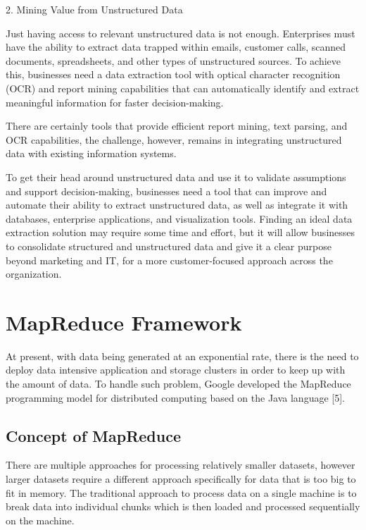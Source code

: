 \documentclass[11pt]{book}
\begin{document}
2.     Mining Value from Unstructured Data

Just having access to relevant unstructured data is not enough. Enterprises must have the ability to extract data trapped within emails, customer calls, scanned documents, spreadsheets, and other types of unstructured sources. To achieve this, businesses need a data extraction tool with optical character recognition (OCR) and report mining capabilities that can automatically identify and extract meaningful information for faster decision-making.


There are certainly tools that provide efficient report mining, text parsing, and OCR capabilities, the challenge, however, remains in integrating unstructured data with existing information systems.

To get their head around unstructured data and use it to validate assumptions and support decision-making, businesses need a tool that can improve and automate their ability to extract unstructured data, as well as integrate it with databases, enterprise applications, and visualization tools. Finding an ideal data extraction solution may require some time and effort, but it will allow businesses to consolidate structured and unstructured data and give it a clear purpose beyond marketing and IT, for a more customer-focused approach across the organization.






\chapter{MapReduce Framework}

At present, with data being generated at an exponential rate, there is the need to deploy data intensive application and storage clusters in order to keep up with the amount of data. To handle such problem, Google developed the MapReduce programming model for distributed computing based on the Java language [5].

\section{Concept of MapReduce}

There are multiple approaches for processing relatively smaller datasets, however larger datasets require a different approach specifically for data that is too big to fit in memory. The traditional approach to process data on a single machine is to break data into individual chunks which is then loaded and processed sequentially on the machine. 
\end{document}

